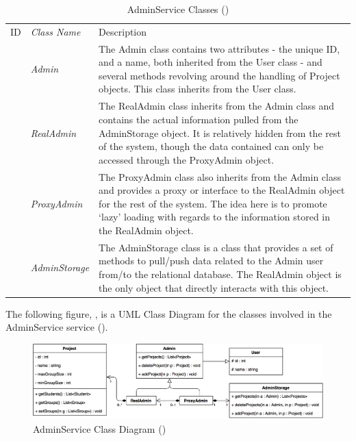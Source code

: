 \documentclass[12pt,letterpaper]{article}
\begin{document}
\begin{table}[H]
	\caption{AdminService Classes ()} 
	\begin{tabu} to 
	    \tableheader{}ID & Class Name & Description \\
		 & Admin & The Admin class contains two attributes - the unique ID, and a name, both inherited from the User class - and several methods revolving around the handling of Project objects. This class inherits from the User class. \\
		 & RealAdmin & The RealAdmin class inherits from the Admin class and contains the actual information pulled from the AdminStorage object. It is relatively hidden from the rest of the system, though the data contained can only be accessed through the ProxyAdmin object. \\
		 & ProxyAdmin & The ProxyAdmin class also inherits from the Admin class and provides a proxy or interface to the RealAdmin object for the rest of the system. The idea here is to promote `lazy' loading with regards to the information stored in the RealAdmin object.\\
		 & AdminStorage & The AdminStorage class is a class that provides a set of methods to pull/push data related to the Admin user from/to the relational database. The RealAdmin object is the only object that directly interacts with this object.\\
	\end{tabu}
\end{table}

The following figure, , is a UML Class Diagram for the classes involved in the AdminService service ().

\begin{figure}[H]
	\centering{}
	\includegraphics[scale=0.27]{imgs/d3/interfaces/admin.png}
	\caption{AdminService Class Diagram ()}
\end{figure}
\end{document}
